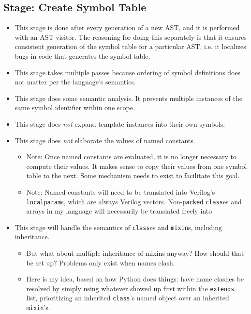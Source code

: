 \documentclass{article}
\begin{document}
	\subsection{Stage:  Create Symbol Table }
		\begin{itemize}
		\item This stage is done after every generation of a new AST, and
			it is performed with an AST visitor.  The reasoning for doing
			this separately is that it ensures consistent generation of the
			symbol table for a particular AST, i.e. it localizes bugs in
			code that generates the symbol table.
		\item This stage takes multiple passes because ordering of symbol
			definitions does not matter per the language's semantics.
		\item This stage does some semantic analysis.  It prevents multiple
			instances of the same symbol identifier within one scope.
		\item This stage does \textit{not} expand template instances into
			their own symbols.
		\item This stage does \textit{not} elaborate the values of named
			constants.
			\begin{itemize}
			\item Note:  Once named constants are evaluated, it is no longer
				necessary to compute their values.  It makes sense to copy
				their values from one symbol table to the next.  Some
				mechanism needs to exist to facilitate this goal.
			\item Note:  Named constants will need to be translated into
				Verilog's \texttt{localparam}s, which are always Verilog
				vectors.  Non-\texttt{packed} \texttt{class}es and arrays
				in my language will necessarily be translated freely into
			\end{itemize}
		\item This stage will handle the semantics of \texttt{class}es and
			\texttt{mixin}s, including inheritance.
			\begin{itemize}
			\item But what about multiple inheritance of mixins anyway?
				How should that be set up?  Problems only exist when names
				clash.
			\item Here is my idea, based on how Python does things:  have
				name clashes be resolved by simply using whatever showed up
				first within the \texttt{extends} list, prioritizing an
				inherited \texttt{class}'s named object over an inherited
				\texttt{mixin}'s.
			\end{itemize}
		\end{itemize}
\end{document}

